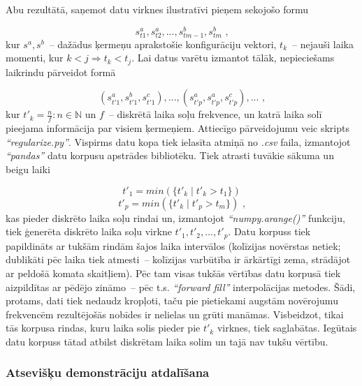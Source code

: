 \documentclass[12pt, a4paper]{article}
\numberwithin{equation}{section} %
\begin{document}
Abu rezultātā, saņemot datu virknes ilustratīvi pieņem sekojošo formu

\begin{equation}
    s^a_{t1}, s^a_{t2}, ..., s^b_{tm-1}, s^b_{tm}
\text{ ,}
\end{equation}
kur $s^a, s^b$~-- dažādus ķermeņu aprakstošie konfigurāciju vektori, $t_k$~-- nejauši laika momenti, kur $k < j \Rightarrow t_k < t_j$. Lai datus varētu izmantot tālāk, nepieciešams laikrindu pārveidot formā

\begin{equation}
    (s^a_{t'1}, s^b_{t'1}, s^c_{t'1}), ..., (s^a_{t'p}, s^a_{t'p}, s^c_{t'p}), ...
\text{ ,}
\end{equation}
kur $t'_k = \frac{n}{f}: n \in \mathbb{N}$ un $f$~-- diskrētā laika soļu frekvence, un katrā laika solī pieejama informācija par visiem ķermeņiem. Attiecīgo pārveidojumu veic skripts \textit{``regularize.py''}. Vispirms datu kopa tiek ielasīta atmiņā no \textit{.csv} faila, izmantojot \textit{``pandas''} datu korpusu apstrādes bibliotēku. Tiek atrasti tuvākie sākuma un beigu laiki

\begin{equation}
    t'_1 = min(\lbrace t'_k \mid t'_k > t_1 \rbrace)
\end{equation}
\begin{equation}
    t'_p = min(\lbrace t'_k \mid t'_p > t_m \rbrace)
\text{ ,}
\end{equation}kas pieder diskrēto laika soļu rindai un, izmantojot \textit{``numpy.arange()''} funkciju, tiek ģenerēta diskrēto laika soļu virkne $t'_1, t'_2, ..., t'_p$. Datu korpuss tiek papildināts ar tukšām rindām šajos laika intervālos (kolīzijas novērstas netiek; dublikāti pēc laika tiek atmesti~-- kolīzijas varbūtība ir ārkārtīgi zema, strādājot ar peldošā komata skaitļiem). Pēc tam visas tukšās vērtības datu korpusā tiek aizpildītas ar pēdējo zināmo~-- pēc t.s. \textit{``forward fill''} interpolācijas metodes. Šādi, protams, dati tiek nedaudz kropļoti, taču pie pietiekami augstām novērojumu frekvencēm rezultējošās nobīdes ir nelielas un grūti manāmas. Visbeidzot, tikai tās korpusa rindas, kuru laika solis pieder pie $t'_k$ virknes, tiek saglabātas. Iegūtais datu korpuss tātad atbilst diskrētam laika solim un tajā nav tukšu vērtību.

\subsubsection{Atsevišķu demonstrāciju atdalīšana}
\end{document}
